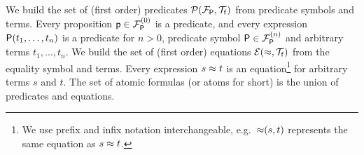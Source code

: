 
\begin{definition}\label{def:predicates}
	We build the set of (first order) {\myem predicates} $\mcPT$
	from predicate symbols and terms. 
	Every proposition $\mpp\in \mcFPn[0]$ is a predicate, 
	and every expression $\mP(t_1,\ldots,t_n)$ is a predicate for $n>0$,
	predicate symbol $\mP\in\mcFPn$ and arbitrary terms $t_1,\ldots,t_n$.
%	
	We build the set of (first order) {\myem equations }$\mcET$ from the equality symbol and terms.
	Every expression $s\mEQ t$ is an equation\footnote{
		We use prefix and infix notation interchangeable, 
		e.g.~${\mEQ}(s,t)$ represents the same equation as $s\mEQ t$.} 
	for arbitrary terms $s$ and $t$.
%	
	The set of atomic formulas (or {\myem atoms }for short) is the union of predicates and equations.
\end{definition}